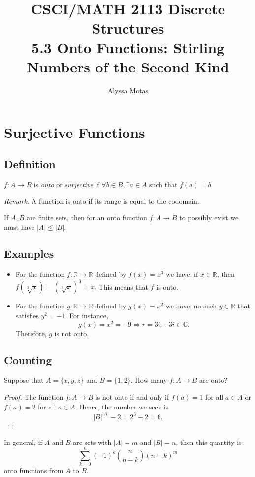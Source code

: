 \documentclass[11pt]{article}
\title{\textbf{CSCI/MATH 2113 Discrete Structures} \\ 5.3 Onto Functions: Stirling Numbers of the Second Kind}
\author{Alyssa Motas}
\begin{document}
    \maketitle

    \pagebreak

    \tableofcontents

    \pagebreak

    \section{Surjective Functions}
    \subsection{Definition}

    \(f: A \rightarrow B\) is \emph{onto} or \emph{surjective} if \(\forall b \in B, \exists a \in A\) such that \(f(a)=b.\)

    \vspace{1em}

    \emph{Remark.} A function is onto if its range is equal to the codomain. 

    \vspace{1em}

    If \(A,B\) are finite sets, then for an onto function \(f: A \rightarrow B\) to possibly exist we must have \(|A| \leq |B|\). 

    \subsection{Examples}
    \begin{itemize}
        \item For the function \(f: \mathbb{R} \rightarrow \mathbb{R}\) defined by \(f(x)=x^3\) we have: if \(x \in \mathbb{R}\), then \(f(\sqrt[3]x) = (\sqrt[3]x)^3 = x.\) This means that $f$ is onto.
        \item For the function \(g: \mathbb{R} \rightarrow \mathbb{R}\) defined by \(g(x)=x^2\) we have: no such \(y \in \mathbb{R}\) that satisfies \(y^2 = -1.\) For instance, \[g(x) = x^2 = -9 \Rightarrow r = 3i, -3i \in \mathbb{C}.\] Therefore, $g$ is not onto.
    \end{itemize}

    \subsection{Counting}

    Suppose that \(A = \{x,y,z\}\) and \(B = \{1,2\}\). How many \(f: A \rightarrow B\) are onto? 
    \begin{proof}
        The function \(f: A \rightarrow B\) is not onto if and only if \(f(a) = 1\) for all \(a \in A\) or \(f(a)=2\) for all \(a \in A\). Hence, the number we seek is \[|B|^{|A|} - 2 = 2^3 - 2 = 6.\]
    \end{proof}
    In general, if $A$ and $B$ are sets with \(|A| = m\) and \(|B| = n\), then this quantity is \[ \sum_{k = 0}^{n} (-1)^k \binom{n}{n - k} (n-k)^m \] onto functions from $A$ to $B$.
\end{document}
